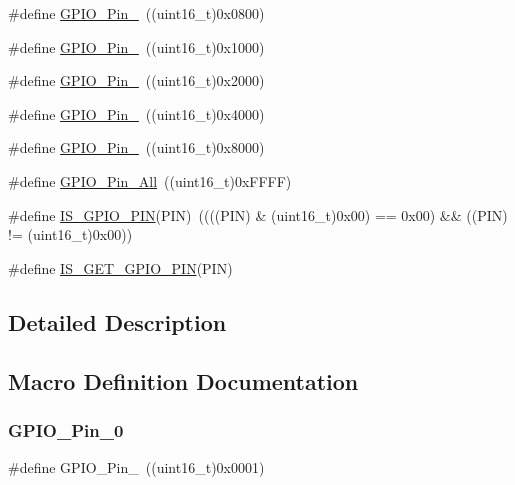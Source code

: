 \begin{DoxyCompactItemize}
\item 
\#define \mbox{\hyperlink{group___g_p_i_o__pins__define_ga5139d5bc3d15784ae7794ed2ae1ff767}{G\+P\+I\+O\+\_\+\+Pin\+\_}}~((uint16\+\_\+t)0x0800)
\item 
\#define \mbox{\hyperlink{group___g_p_i_o__pins__define_gada91257dcaab2c86f75fbd8e4b52b98c}{G\+P\+I\+O\+\_\+\+Pin\+\_}}~((uint16\+\_\+t)0x1000)
\item 
\#define \mbox{\hyperlink{group___g_p_i_o__pins__define_ga4155a41c433f3657b9c79cfbd4240966}{G\+P\+I\+O\+\_\+\+Pin\+\_}}~((uint16\+\_\+t)0x2000)
\item 
\#define \mbox{\hyperlink{group___g_p_i_o__pins__define_ga21cd1d89c0c061a6f09c5a842610bee5}{G\+P\+I\+O\+\_\+\+Pin\+\_}}~((uint16\+\_\+t)0x4000)
\item 
\#define \mbox{\hyperlink{group___g_p_i_o__pins__define_gae686a9fc47cf3e420e5db0784210711d}{G\+P\+I\+O\+\_\+\+Pin\+\_}}~((uint16\+\_\+t)0x8000)
\item 
\#define \mbox{\hyperlink{group___g_p_i_o__pins__define_gaba3e915ddca17a1211edc07b7fd97e8b}{G\+P\+I\+O\+\_\+\+Pin\+\_\+\+All}}~((uint16\+\_\+t)0x\+F\+F\+F\+F)
\item 
\#define \mbox{\hyperlink{group___g_p_i_o__pins__define_gad6ec74e33360395535ad5d91ba6d4781}{I\+S\+\_\+\+G\+P\+I\+O\+\_\+\+P\+IN}}(P\+IN)~((((P\+IN) \& (uint16\+\_\+t)0x00) == 0x00) \&\& ((\+P\+I\+N) != (uint16\+\_\+t)0x00))
\item 
\#define \mbox{\hyperlink{group___g_p_i_o__pins__define_gaddf7154b7f30b7c0a70f3aeaff5ddffc}{I\+S\+\_\+\+G\+E\+T\+\_\+\+G\+P\+I\+O\+\_\+\+P\+IN}}(P\+IN)
\end{DoxyCompactItemize}


\subsection{Detailed Description}


\subsection{Macro Definition Documentation}
\mbox{\label{group___g_p_i_o__pins__define_gab305b8d1be9f89bf2b4a05589b456049}} 
\subsubsection{\texorpdfstring{GPIO\_Pin\_0}{GPIO\_Pin\_0}}
{\footnotesize\ttfamily \#define G\+P\+I\+O\+\_\+\+Pin\+\_~((uint16\+\_\+t)0x0001)}

